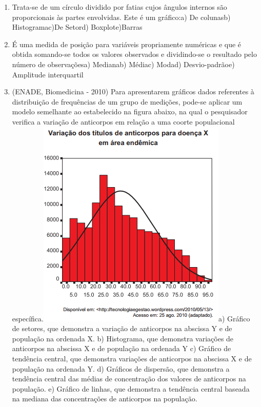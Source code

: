 \documentclass[
]{book}
\providecommand{\tightlist}{%
  \setlength{\itemsep}{0pt}\setlength{\parskip}{0pt}}
\newenvironment{question}{
  \definecolor{shadecolor}{rgb}{0, 0, 0}  %
  \color{white}
  \begin{shaded}}
 {\end{shaded}}
\begin{document}
\begin{question}

\begin{enumerate}
\def\labelenumi{\arabic{enumi}.}
\tightlist
\item
  Trata-se de um círculo dividido por fatias cujos ângulos internos são proporcionais às partes envolvidas. Este é um gráfico:a) De colunasb) Histogramac)De Setord) Boxplote)Barras
\item
  É uma medida de posição para variáveis propriamente numéricas e que é obtida somando-se todos os valores observados e dividindo-se o resultado pelo número de observaçõesa) Medianab) Médiac) Modad) Desvio-padrãoe) Amplitude interquartil
\item
  (ENADE, Biomedicina - 2010) Para apresentarem gráficos dados referentes à distribuição de frequências de um grupo de medições, pode-se aplicar um modelo semelhante ao estabelecido na figura abaixo, na qual o pesquisador verifica a variação de anticorpos em relação a uma coorte populacional específica.\includegraphics{./img/exercicio_histograma.png}a) Gráfico de setores, que demonstra a variação de anticorpos na abscissa Y e de população na ordenada X. b) Histograma, que demonstra variações de anticorpos na abscissa X e de população na ordenada Y c) Gráfico de tendência central, que demonstra variações de anticorpos na abscissa X e de população na ordenada Y. d) Gráficos de dispersão, que demonstra a tendência central das médias de concentração dos valores de anticorpos na população. e) Gráfico de linhas, que demonstra a tendência central baseada na mediana das concentrações de anticorpos na população.
\end{enumerate}

\end{question}
\end{document}
